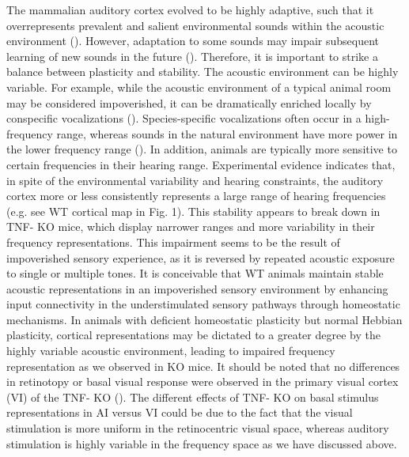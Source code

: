 The mammalian auditory cortex evolved to be highly adaptive, such that it overrepresents prevalent and salient environmental sounds within the acoustic environment (\cite{Diamond1986, Gonzalez-Lima1986, Ohl1996, Pantev1998, Edeline1999, Gao2000, Zhang2001, Syka2002, Fritz2003, Mrsic-Flogel2003, Dean2005, Popescu2010, Cohen2011, Takahashi2011}). However, adaptation to some sounds may impair subsequent learning of new sounds in the future (\cite{Sarro2011}). Therefore, it is important to strike a balance between plasticity and stability. The acoustic environment can be highly variable. For example, while the acoustic environment of a typical animal room may be considered impoverished, it can be dramatically enriched locally by conspecific vocalizations (\cite{Kim2009, Grimsley2011}). Species-specific vocalizations often occur in a high-frequency range, whereas sounds in the natural environment have more power in the lower frequency range (\cite{Liu2003, Kim2009}). In addition, animals are typically more sensitive to certain frequencies in their hearing range. Experimental evidence indicates that, in spite of the environmental variability and hearing constraints, the auditory cortex more or less consistently represents a large range of hearing frequencies (e.g. see WT cortical map in Fig. 1). This stability appears to break down in TNF-\textalpha{} KO mice, which display narrower ranges and more variability in their frequency representations. This impairment seems to be the result of impoverished sensory experience, as it is reversed by repeated acoustic exposure to single or multiple tones. It is conceivable that WT animals maintain stable acoustic representations in an impoverished sensory environment by enhancing input connectivity in the understimulated sensory pathways through homeostatic mechanisms. In animals with deficient homeostatic plasticity but normal Hebbian plasticity, cortical representations may be dictated to a greater degree by the highly variable acoustic environment, leading to impaired frequency representation as we observed in KO mice. It should be noted that no differences in retinotopy or basal visual response were observed in the primary visual cortex (VI) of the TNF-\textalpha{} KO (\cite{Kaneko2008}). The different effects of TNF-\textalpha{} KO on basal stimulus representations in AI versus VI could be due to the fact that the visual stimulation is more uniform in the retinocentric visual space, whereas auditory stimulation is highly variable in the frequency space as we have discussed above.

